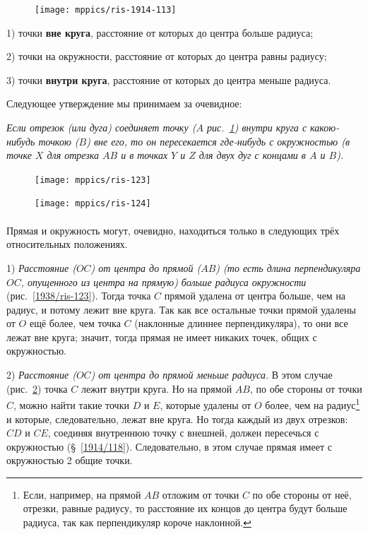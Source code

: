 \documentclass[oneside]{book}
\makeatletter
\newcommand{\rindex}[2][\imki@jobname]{%
  \index[#1]{\detokenize{#2}}%
}
\makeatother
\begin{document}
\begin{figure}
\centering
\texttt{[image: mppics/ris-1914-113]}
\caption{}\label{1914/ris-113}
\end{figure}


1) точки \rindex{внешние точки круга}\textbf{вне круга}, расстояние от которых до центра больше радиуса; 

2) точки на окружности, расстояние от которых до центра равны радиусу; 

3) точки \rindex{внутренние точки круга}\textbf{внутри круга}, расстояние от которых до центра меньше радиуса. 

Следующее утверждение мы принимаем за очевидное:

\emph{Если отрезок (или дуга) соединяет точку \emph{($A$ рис.~\ref{1914/ris-113})} внутри круга с какою-нибудь точкою \emph{($B$)} вне его, то он пересекается где-нибудь с окружностью \emph{(в точке $X$ для отрезка $AB$ и в точках $Y$ и $Z$ для двух дуг с концами в $A$ и $B$)}.}


\begin{figure}
\centering
\texttt{[image: mppics/ris-123]}
\caption{}\label{1938/ris-123}
\bigskip
\texttt{[image: mppics/ris-124]}
\caption{}\label{1938/ris-124}
\end{figure}

\paragraph{}\label{1938/112}
Прямая и окружность могут, очевидно, находиться только в следующих трёх относительных положениях.

1) \emph{Расстояние \emph{($OC$)} от центра до прямой \emph{($AB$) (то есть длина перпендикуляра $OC$, опущенного из центра на прямую)} больше радиуса окружности} (рис.~\ref{1938/ris-123}).
Тогда точка $C$ прямой удалена от центра больше, чем на радиус, и потому лежит вне круга.
Так как все остальные точки прямой удалены от $O$ ещё более, чем точка $C$ (наклонные длиннее перпендикуляра), то они все лежат вне круга;
значит, тогда прямая не имеет никаких точек, общих с окружностью.

2) \emph{Расстояние \emph{($OC$)} от центра до прямой меньше радиуса.}
В этом случае (рис.~\ref{1938/ris-124}) точка $C$ лежит внутри круга. 
Но на прямой $AB$, по обе стороны от точки $C$, можно найти такие точки $D$ и $E$, которые удалены от $O$ более, чем на радиус\footnote{Если, например, на прямой $AB$ отложим от точки $C$ по обе стороны от неё, отрезки, равные радиусу, то расстояние их концов до центра будут больше радиуса, так как перпендикуляр короче наклонной.}
и которые, следовательно, лежат вне круга.
Но тогда каждый из двух отрезков: $CD$ и $CE$, соединяя внутреннюю точку с внешней, должен пересечься с окружностью (§~\ref{1914/118}).
Следовательно, в этом случае прямая имеет с окружностью 2 общие точки.
\end{document}
